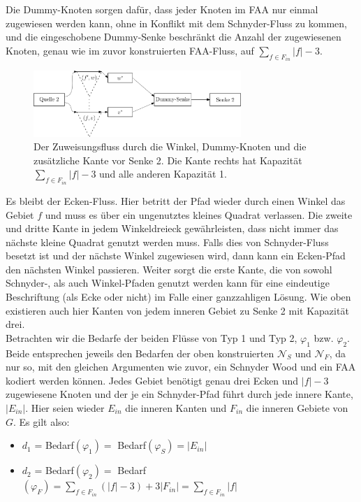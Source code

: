 Die Dummy-Knoten sorgen dafür, dass jeder Knoten im FAA nur einmal zugewiesen werden kann, ohne in Konflikt mit dem Schnyder-Fluss zu kommen, und die eingeschobene Dummy-Senke beschränkt die Anzahl der zugewiesenen Knoten, genau wie im zuvor konstruierten FAA-Fluss, auf $\sum_{f \in F_{in}} |f|-3$.
\begin{figure}[h]
	\centering
  	\includegraphics[width=0.7\textwidth]{dummy_sink.png}
  	\caption{Der Zuweisungsfluss durch die Winkel, Dummy-Knoten und die zusätzliche Kante vor Senke 2. Die Kante rechts hat Kapazität $\sum_{f \in F_{in}} |f|-3$ und alle anderen Kapazität 1.}
	\label{dummy_sink}
\end{figure}
Es bleibt der Ecken-Fluss. Hier betritt der Pfad wieder durch einen Winkel das Gebiet $f$ und muss es über ein ungenutztes kleines Quadrat verlassen. Die zweite und dritte Kante in jedem Winkeldreieck gewährleisten, dass nicht immer das nächste kleine Quadrat genutzt werden muss. Falls dies von Schnyder-Fluss besetzt ist und der nächste Winkel zugewiesen wird, dann kann ein Ecken-Pfad den nächsten Winkel passieren. Weiter sorgt die erste Kante, die von sowohl Schnyder-, als auch Winkel-Pfaden genutzt werden kann für eine eindeutige Beschriftung (als Ecke oder nicht) im Falle einer ganzzahligen Lösung. Wie oben existieren auch hier Kanten von jedem inneren Gebiet zu Senke 2 mit Kapazität drei.\\

Betrachten wir die Bedarfe der beiden Flüsse von Typ 1 und Typ 2, $\varphi_1$ bzw. $\varphi_2$. Beide entsprechen jeweils den Bedarfen der oben konstruierten $\mathcal{N}_S$ und $\mathcal{N}_F$, da nur so, mit den gleichen Argumenten wie zuvor, ein Schnyder Wood und ein FAA kodiert werden können. Jedes Gebiet benötigt genau drei Ecken und $|f|-3$ zugewiesene Knoten und der je ein Schnyder-Pfad führt durch jede innere Kante, $|E_{in}|$. Hier seien wieder $E_{in}$ die inneren Kanten und $F_{in}$ die inneren Gebiete von $G$. Es gilt also:

\begin{itemize}
\item $d_1$ = Bedarf$(\varphi_1) = $ Bedarf$(\varphi_S) = |E_{in}|$
\item $d_2$ = Bedarf$(\varphi_2) = $ Bedarf$(\varphi_F) =  \sum_{f \in F_{in}}(|f|-3) + 3|F_{in}| = \sum_{f \in F_{in}} |f|$
\end{itemize}

